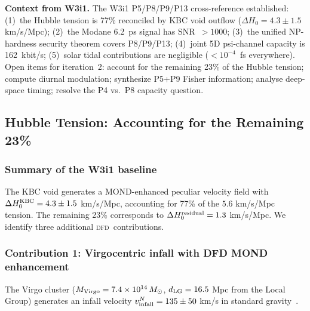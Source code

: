 \documentclass[aps,prd,twocolumn,superscriptaddress,nofootinbib,longbibliography]{revtex4-2}
\newcommand{\DFD}{\textsc{dfd}}
\begin{document}
\textbf{Context from W3i1.}  The W3i1 P5/P8/P9/P13 cross-reference
established: (1)~the Hubble tension is 77\% reconciled by KBC void
outflow ($\Delta H_0 = 4.3\pm1.5$ km/s/Mpc); (2)~the Modane
6.2~ps signal has SNR~$>1000$; (3)~the unified NP-hardness security
theorem covers P8/P9/P13; (4)~joint 5D psi-channel capacity is
162~kbit/s; (5)~solar tidal contributions are negligible
($<10^{-4}$~fs everywhere).  Open items for iteration~2: account
for the remaining 23\% of the Hubble tension; compute diurnal
modulation; synthesize P5+P9 Fisher information; analyse deep-space
timing; resolve the P4 vs.\ P8 capacity question.

\subsection{Hubble Tension: Accounting for the Remaining 23\%}
\label{sec:hubble23}

\subsubsection{Summary of the W3i1 baseline}

The KBC void generates a MOND-enhanced peculiar velocity field
with $\Delta H_0^{\rm KBC} = 4.3\pm1.5$ km/s/Mpc, accounting for
77\% of the $5.6$ km/s/Mpc tension.  The remaining 23\% corresponds
to $\Delta H_0^{\rm residual} = 1.3$ km/s/Mpc.  We identify
three additional \DFD\ contributions.

\subsubsection{Contribution 1: Virgocentric infall with DFD MOND enhancement}
\label{sec:virgo}

The Virgo cluster ($M_{\rm Virgo} = 7.4\times10^{14}\,M_\odot$,
$d_{\rm LG} = 16.5$ Mpc from the Local Group) generates an infall
velocity $v_{\rm infall}^N = 135\pm50$ km/s in standard
gravity~\cite{Karachentsev2006}.
\end{document}
